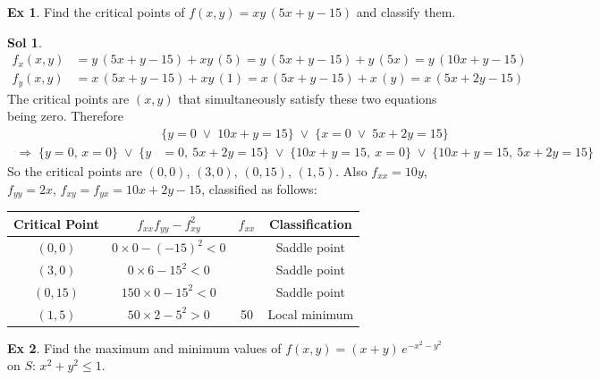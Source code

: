 \documentclass[12pt]{extarticle}
\newcommand{\ds}{\displaystyle}
\newcommand{\ie}{\;\Longrightarrow\;}
\newcommand{\orr}{\;\vee\;}
\theoremstyle{definition}
\newtheorem*{ex}{Ex}
\newtheorem*{sol}{Sol}
\begin{document}
\begin{ex} 
  Find the critical points of $\ds f(x,y) = xy\,(5x + y - 15)$ and classify them. 
\end{ex}

\begin{sol}
  \begin{align*}
    f_x(x, y) &= y\,(5x+y-15)+xy\,(5) = y\,(5x+y-15)+y\,(5x) = y\,(10x+y-15) \\
    f_y(x, y) &= x\,(5x+y-15) + xy\,(1) = x\,(5x+y-15)+ x\,(y) = x\,(5x+2y-15)
  \end{align*}
  The critical points are $(x, y)$ that simultaneously satisfy these two equations being zero. Therefore 
  \begin{align*}
    &\big\{y=0 \orr 10x+y=15\big\} \orr \big\{x=0 \orr 5x+2y=15\big\} \\
    \ie \big\{y=0,\, x=0\big\}\orr\big\{y&=0,\ 5x+2y=15\big\}\orr\big\{10x+y=15,\ x=0\big\}\orr\big\{10x+y=15,\ 5x+2y=15\big\}
  \end{align*}
  So the critical points are $(0, 0)$, $(3, 0)$, $(0, 15)$, $(1,5)$. Also $\ds f_{xx} = 10 y$, $\ds f_{yy} = 2x$, $\ds f_{xy} = f_{yx} = 10x + 2y - 15$, classified as follows: 
  \begin{center}
  \renewcommand{\arraystretch}{1.3}
  \begin{tabular}{cccc}
    \toprule
    Critical Point  & $f_{xx}f_{yy}-f_{xy}^2$ & $f_{xx}$ & Classification \\    
    \midrule
    $(0, 0)$  & $0\times0-(-15)^2 < 0$ & & Saddle point \\ 
    $(3, 0)$  & $0\times 6-15^2 < 0$  & & Saddle point \\ 
    $(0, 15)$ & $150\times0-15^2 < 0$ & & Saddle point \\ 
    $(1, 5)$  & $50\times 2-5^2 > 0$ & 50 & Local minimum \\ \bottomrule
  \end{tabular}
  \renewcommand{\arraystretch}{1.0}
  \end{center}
\end{sol}

\begin{ex}
  Find the maximum and minimum values of $\ds f(x, y) = (x + y)\,e^{-x^2 - y^2}$ on $S:\,x^2 + y^2 \leqslant 1$. 
\end{ex}
\end{document}
